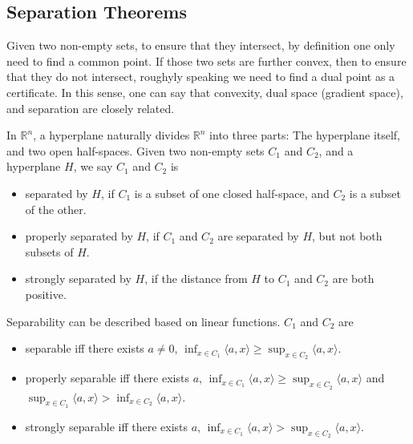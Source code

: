 \documentclass[openany]{book}
\theoremstyle{definition}
\theoremstyle{remark}
\begin{document}
\subsection{Separation Theorems}
Given two non-empty sets, to ensure that they intersect, by definition one only need to find a common point. If those two sets are further convex, then to ensure that they do not intersect, roughyly speaking we need to find a dual point as a certificate. In this sense, one can say that convexity, dual space (gradient space), and separation are closely related.

In $\mathbb{R}^n$, a hyperplane naturally divides $\mathbb{R}^n$ into three parts: The hyperplane itself, and two open half-spaces. Given two non-empty sets $C_1$ and $C_2$, and a hyperplane $H$, we say $C_1$ and $C_2$ is
\begin{itemize}
    \item separated by $H$, if $C_1$ is a subset of one closed half-space, and $C_2$ is a subset of the other.
    \item properly separated by $H$, if $C_1$ and $C_2$ are separated by $H$, but not both subsets of $H$.
    \item strongly separated by $H$, if the distance from $H$ to $C_1$ and $C_2$ are both positive.
\end{itemize}

Separability can be described based on linear functions. $C_1$ and $C_2$ are
\begin{itemize}
    \item separable iff there exists $a\ne0$, $\inf_{x\in C_1}\langle a,x\rangle\ge\sup_{x\in C_2}\langle a,x\rangle$.
    \item properly separable iff there exists $a$, $\inf_{x\in C_1}\langle a,x\rangle\ge\sup_{x\in C_2}\langle a,x\rangle$ and $\sup_{x\in C_1}\langle a,x\rangle>\inf_{x\in C_2}\langle a,x\rangle$.
    \item strongly separable iff there exists $a$, $\inf_{x\in C_1}\langle a,x\rangle>\sup_{x\in C_2}\langle a,x\rangle$.
\end{itemize}
\end{document}
